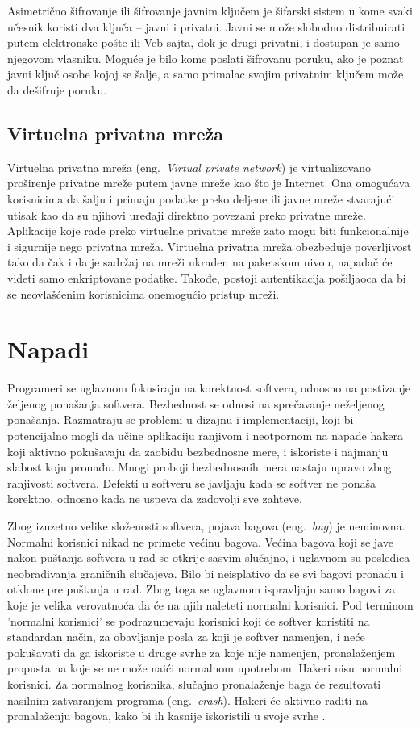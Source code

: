 \documentclass[a4paper]{article}
\begin{document}
Asimetrično šifrovanje ili šifrovanje javnim ključem je šifarski sistem u kome svaki učesnik koristi dva ključa – javni i privatni. Javni se može slobodno distribuirati putem elektronske pošte ili Veb sajta, dok je drugi privatni, i dostupan je samo njegovom vlasniku. Moguće je bilo kome poslati šifrovanu poruku, ako je poznat javni ključ osobe kojoj se šalje, a samo primalac svojim privatnim ključem može da dešifruje poruku.

\subsection{Virtuelna privatna mreža}
\label{subsec:virtuelna privatna mreza}

Virtuelna privatna mreža (eng.~{\em Virtual private network}) je virtualizovano proširenje privatne mreže putem javne mreže kao što je Internet. Ona omogućava korisnicima da šalju i primaju podatke preko deljene ili javne mreže stvarajući utisak kao da su njihovi uređaji direktno povezani preko privatne mreže. Aplikacije koje rade preko virtuelne privatne mreže zato mogu biti funkcionalnije i sigurnije nego privatna mreža. Virtuelna privatna mreža obezbeđuje poverljivost tako da čak i da je sadržaj na mreži ukraden na paketskom nivou, napadač će videti samo enkriptovane podatke. Takođe, postoji autentikacija pošiljaoca da bi se neovlašćenim korisnicima onemogućio pristup mreži.

\section{Napadi}
\label{sec:napadi}
Programeri se uglavnom fokusiraju na korektnost softvera, odnosno na postizanje željenog ponašanja softvera. Bezbednost se odnosi na sprečavanje neželjenog ponašanja. Razmatraju se problemi u dizajnu i implementaciji, koji bi potencijalno mogli da učine aplikaciju ranjivom i neotpornom na napade hakera koji aktivno pokušavaju da zaobiđu bezbednosne mere, i iskoriste i najmanju slabost koju pronađu. Mnogi proboji bezbednosnih mera nastaju upravo zbog ranjivosti softvera. Defekti u softveru se javljaju kada se softver ne ponaša korektno, odnosno kada ne uspeva da zadovolji sve zahteve.

Zbog izuzetno velike složenosti softvera, pojava bagova (eng.~{\em bug}) je neminovna. Normalni korisnici nikad ne primete većinu bagova. Većina bagova koji se jave nakon puštanja softvera u rad se otkrije sasvim slučajno, i uglavnom su posledica neobrađivanja graničnih slučajeva. Bilo bi neisplativo da se svi bagovi pronađu i otklone pre puštanja u rad. Zbog toga se uglavnom ispravljaju samo bagovi za koje je velika verovatnoća da će na njih naleteti normalni korisnici. Pod terminom 'normalni korisnici' se podrazumevaju korisnici koji će softver koristiti na standardan način, za obavljanje posla za koji je softver namenjen, i neće pokušavati da ga iskoriste u druge svrhe za koje nije namenjen, pronalaženjem propusta na koje se ne može naići normalnom upotrebom. Hakeri nisu normalni korisnici. Za normalnog korisnika, slučajno pronalaženje baga će rezultovati nasilnim zatvaranjem programa (eng.~{\em crash}). Hakeri će aktivno raditi na pronalaženju bagova, kako bi ih kasnije iskoristili u svoje svrhe \cite{softwaresecurity}.
\end{document}
